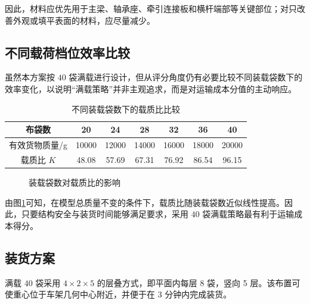 \documentclass[UTF8,a4paper,12pt,fontset=none]{ctexart}
\numberwithin{equation}{section}
\numberwithin{figure}{section}
\numberwithin{table}{section}
\begin{document}
因此，材料应优先用于主梁、轴承座、牵引连接板和横杆端部等关键部位；对只改善外观或填平表面的材料，应尽量减少。

\subsection{不同载荷档位效率比较}
虽然本方案按 $40$ 袋满载进行设计，但从评分角度仍有必要比较不同装载袋数下的效率变化，以说明“满载策略”并非主观追求，而是对运输成本分值的主动响应。

\begin{table}[H]
\centering
\caption{不同装载袋数下的载质比比较}
\label{tab:bag-efficiency}
\begin{tabular}{c c c c c c c}
\toprule
\textbf{布袋数} & \textbf{20} & \textbf{24} & \textbf{28} & \textbf{32} & \textbf{36} & \textbf{40} \\\midrule
有效货物质量/g & 10000 & 12000 & 14000 & 16000 & 18000 & 20000 \\
载质比 $K$ & 48.08 & 57.69 & 67.31 & 76.92 & 86.54 & 96.15 \\
\bottomrule
\end{tabular}
\end{table}

\begin{figure}[H]
\centering
{}
\caption{装载袋数对载质比的影响}
\label{fig:bag-efficiency}
\end{figure}

由图\ref{fig:bag-efficiency}可知，在模型总质量不变的条件下，载质比随装载袋数近似线性提高。因此，只要结构安全与装货时间能够满足要求，采用 $40$ 袋满载策略最有利于运输成本得分。

\subsection{装货方案}
满载 $40$ 袋采用 $4\times2\times5$ 的层叠方式，即平面内每层 8 袋，竖向 5 层。该布置可使重心位于车架几何中心附近，并便于在 3 分钟内完成装货。
\end{document}
